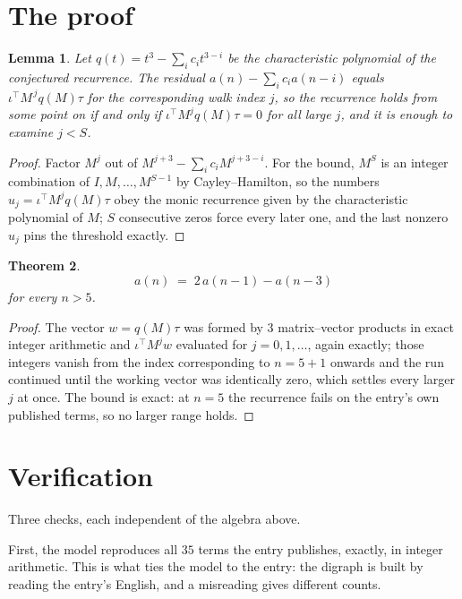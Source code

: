 \documentclass[11pt,a4paper]{article}
\theoremstyle{plain}
\newtheorem{theorem}{Theorem}
\newtheorem{lemma}[theorem]{Lemma}
\theoremstyle{definition}
\begin{document}
\section{The proof}

\begin{lemma}\label{lem:crit}
Let $q(t)=t^{3}-\sum_i c_it^{3-i}$ be the characteristic polynomial of the
conjectured recurrence. The residual $a(n)-\sum_ic_ia(n-i)$ equals
$\iota^{\!\top}M^{\,j}q(M)\tau$ for the corresponding walk index $j$, so the recurrence
holds from some point on if and only if $\iota^{\!\top}M^{j}q(M)\tau=0$ for all large $j$,
and it is enough to examine $j<S$.
\end{lemma}

\begin{proof}
Factor $M^{j}$ out of $M^{j+3}-\sum_ic_iM^{j+3-i}$. For the bound, $M^{S}$
is an integer combination of $I,M,\dots,M^{S-1}$ by Cayley--Hamilton, so the numbers
$u_j=\iota^{\!\top}M^{j}q(M)\tau$ obey the monic recurrence given by the characteristic
polynomial of $M$; $S$ consecutive zeros force every later one, and the last nonzero $u_j$
pins the threshold exactly.
\end{proof}

\begin{theorem}
\[
a(n)\;=\;2\,a(n-1) - a(n-3)
\]
for every $n>5$.
\end{theorem}

\begin{proof}
The vector $w=q(M)\tau$ was formed by $3$ matrix--vector products in exact integer
arithmetic and $\iota^{\!\top}M^{j}w$ evaluated for $j=0,1,\dots$, again exactly; those
integers vanish from the index corresponding to $n=5+1$ onwards and the run continued
until the working vector was identically zero, which settles every larger $j$ at once. The bound is exact: at $n=5$ the recurrence fails on the entry's own published terms, so no larger range holds.
\end{proof}

\section{Verification}

Three checks, each independent of the algebra above.

First, the model reproduces all $35$ terms the entry publishes, exactly, in integer
arithmetic. This is what ties the model to the entry: the digraph is built by reading the
entry's English, and a misreading gives different counts.
\end{document}
